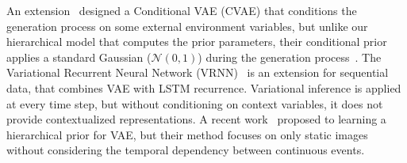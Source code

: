 \documentclass{article}
\newcommand{\latentvariables}{\mathbf{z}}
\newcommand{\inference}{q}
\newcommand{\generation}{p}
\newcommand{\observation}{\boldsymbol{o}}
\begin{document}
An extension~\cite{WalkerDGH16} designed a Conditional VAE (CVAE) that conditions the generation process on some external environment variables, but unlike our hierarchical model that computes the prior parameters, their conditional prior applies a standard Gaussian ($\mathcal{N}(0,1)$) during the generation process~\cite{Doersch16}.
The Variational Recurrent Neural Network (VRNN)~\cite{ChungKDGCB15} is an extension for sequential data, that combines VAE with LSTM recurrence. Variational inference is applied at every time step, but without conditioning on context variables, it does not provide contextualized representations. A recent work~\cite{KlushynCKCS19vae} proposed to learning a hierarchical prior for VAE, but their method focuses on only static images without considering the temporal dependency between continuous events.
\end{document}
